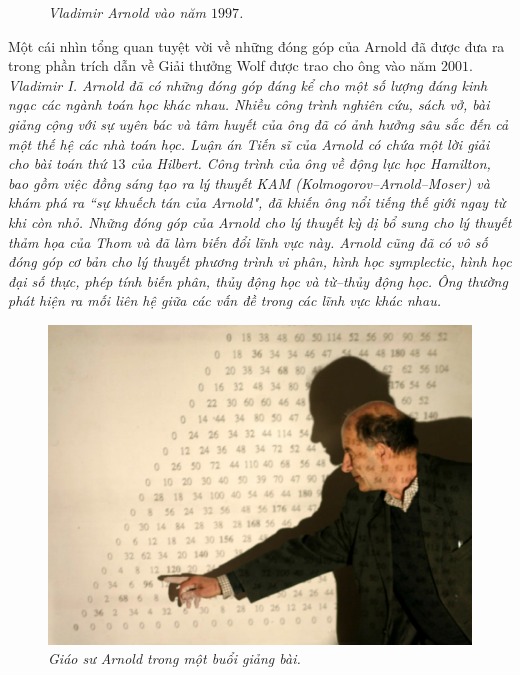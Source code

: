 \begin{multicols}{2}
\begin{figure}[H]
		\caption{\small\textit{\color{quantoan}Vladimir Arnold vào năm $1997$.}}
		\vspace*{-10pt}
	\end{figure}
	Một cái nhìn tổng quan tuyệt vời về những đóng góp của Arnold đã được đưa ra trong phần trích dẫn về Giải thưởng Wolf được trao cho ông vào năm $2001$.
	\vskip 0.1cm
	\textit{Vladimir I. Arnold đã có những đóng góp đáng kể cho một số lượng đáng kinh ngạc các ngành toán học khác nhau. Nhiều công trình nghiên cứu, sách vở, bài giảng cộng với sự uyên bác và tâm huyết của ông đã có ảnh hưởng sâu sắc đến cả một thế hệ các nhà toán học. Luận án Tiến sĩ của Arnold có chứa một lời giải cho bài toán thứ $13$ của Hilbert. Công trình của ông về động lực học Hamilton, bao gồm việc đồng sáng tạo ra lý thuyết KAM (Kolmogorov--Arnold--Moser) và khám phá ra ``sự khuếch tán của Arnold", đã khiến ông nổi tiếng thế giới ngay từ khi còn nhỏ. Những đóng góp của Arnold cho lý thuyết kỳ dị bổ sung cho lý thuyết thảm họa của Thom và đã làm biến đổi lĩnh vực này. Arnold cũng đã có vô số đóng góp cơ bản cho lý thuyết phương trình vi phân, hình học symplectic, hình học đại số thực, phép tính biến phân, thủy động học và từ--thủy động học.  Ông thường phát hiện ra mối liên hệ giữa các vấn đề trong các lĩnh vực khác nhau.}
	\begin{figure}[H]
		\vspace*{-5pt}
		\centering
		\captionsetup{labelformat= empty, justification=centering}
		\includegraphics[width= 1\linewidth]{3}
		\caption{\small\textit{\color{quantoan}Giáo sư Arnold trong một buổi giảng bài.}}
		\vspace*{-10pt}

\end{figure}
\end{multicols}
